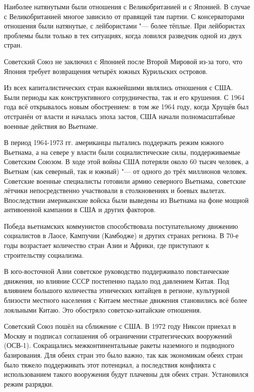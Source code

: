 \documentclass{article}
\begin{document}
Наиболее натянутыми были отношения с Великобританией и с Японией. В случае с Великобританией многое зависило от правящей там партии. С консерваторами отношения были натянутые, с лейбористами "--- более тёплые. При лейбористах проблемы были только в тех ситуациях, когда ловился разведчик одной из двух стран.

Советский Союз не заключил с Японией после Второй Мировой из-за того, что Япония требует возвращения четырёх южных Курильских островов.

Из всех капиталистических стран важнейшими являлись отношения с США. Были периоды как конструктивного сотрудничества, так и его крушения. С 1964 года всё открывалось новым обострением: в том же 1964 году, когда Хрущёв был отстранён от власти и началась эпоха застоя, США начали полномасштабные военные действия во Вьетнаме.

В период 1964-1973 гг. американцы пытались поддержать режим южного Вьетнама, а на севере у власти были социалистические силы, поддерживаемые Советским Союзом. В ходе этой войны США потеряли около 60 тысяч человек, а Вьетнам (как северный, так и южный) "--- от одного до трёх миллионов человек. Советские военные специалисты готовили армию северного Вьетнама, советские лётчики непосредственно участвовали в столкновениях и боевых вылетах. Впоследствии американские войска были выведены из Вьетнама на фоне мощной антивоенной кампании в США и других факторов.

Победа вьетнамских коммунистов способствовала поступательному движению социалистов в Лаосе, Кампучии (Камбодже) и других странах региона. В 70-е годы возрастает количество стран Азии и Африки, где приступают к строительству социализма.

В юго-восточной Азии советское руководство поддерживало повстанческие движения, но влияние СССР постепенно падало под давлением Китая. Под влиянием большого количества этнических китайцев в регионе, культурной близости местного населения с Китаем местные движения становились всё более лояльными Китаю. Это обостряло советско-китайские отношения.

Советский Союз пошёл на сближение с США. В 1972 году Никсон приехал в Москву и подписал соглашения об ограничении стратегических вооружений (ОСВ-1). Сокращались межконтинентальные ракеты наземного и подводного базирования. Для обеих стран это было важно, так как экономикам обеих стран было тяжело поддерживать этот потенциал, а последствия конфликта с использованием такого вооружения будут плачевны для обеих стран. Установился режим разрядки.
\end{document}

